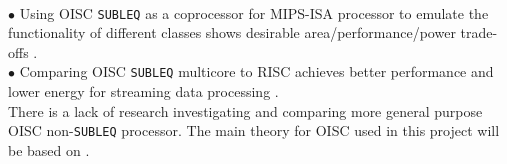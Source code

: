 \documentclass[a4paper,12pt]{article}
\begin{document}
\begin{multicols}{2}
\\
$\bullet$ Using OISC \texttt{SUBLEQ} as a coprocessor for MIPS-ISA processor to emulate the functionality of different classes shows desirable area/performance/power trade-offs \autocite{ahmed_sakamoto_anderson_hara-azumi_2015}.
\\
$\bullet$ Comparing OISC \texttt{SUBLEQ} multicore to RISC achieves better performance and lower energy for streaming data processing \autocite{yokota_saso_hara-azumi_2017}.
\\
There is a lack of research investigating and comparing more general purpose OISC non-\texttt{SUBLEQ} processor. The main theory for OISC used in this project will be based on \autocite{ong_ang_seng_2010,gilreath_laplante_2003,kong_ang_seng_adejo_2010,dharshana_balasubramanian_arun_2016}.
\columnbreak

\end{multicols}
\end{document}
